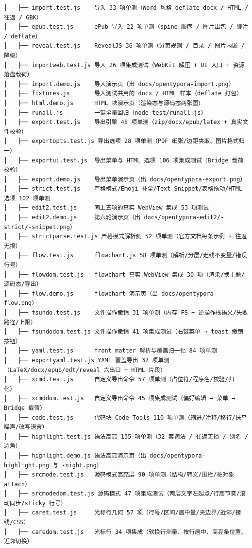 \documentclass[11pt,a4paper]{ctexart}
\begin{document}
\begin{verbatim}
│   ├── import.test.js    导入 33 项单测（Word 风格 deflate docx / HTML / 往返 / GBK）
│   ├── epub.test.js      ePub 导入 22 项单测（spine 顺序 / 图片出包 / 脚注 / deflate）
│   ├── reveal.test.js    RevealJS 36 项单测（分页规则 / 目录 / 图片内嵌 / 降级）
│   ├── importweb.test.js 导入 26 项集成测试（WebKit 解压 + UI 入口 + 资源落盘载荷）
│   ├── import.demo.js    导入演示页（出 docs/opentypora-import.png）
│   ├── fixtures.js       导入测试共用的 docx / HTML 样本（deflate 打包）
│   ├── html.demo.js      HTML 块演示页（渲染态与源码态两张图）
│   ├── runall.js         一键全量回归（node test/runall.js）
│   ├── export.test.js    导出引擎 48 项单测（zip/docx/epub/latex + 真实文件校验）
│   ├── exportopts.test.js 导出选项 28 项单测（PDF 纸张/边距夹取、图片格式归一）
│   ├── exportui.test.js  导出菜单与 HTML 选项 106 项集成测试（Bridge 载荷校验）
│   ├── export.demo.js    导出菜单演示页（出 docs/opentypora-export.png）
│   ├── strict.test.js    严格模式/Emoji 补全/Text Snippet/表格拖动/HTML 选项 102 项单测
│   ├── edit2.test.js     同上五项的真实 WebView 集成 53 项测试
│   ├── edit2.demo.js     第六轮演示页（出 docs/opentypora-edit2/-strict/-snippet.png）
│   ├── strictparse.test.js 严格模式解析侧 52 项单测（官方文档每条示例 + 往返无损）
│   ├── flow.test.js      flowchart.js 58 项单测（解析/分层/走线不变量/错误行号）
│   ├── flowdom.test.js   flowchart 真实 WebView 集成 30 项（渲染/换主题/源码态/导出）
│   ├── flow.demo.js      flowchart 演示页（出 docs/opentypora-flow.png）
│   ├── fsundo.test.js    文件操作撤销 31 项单测（内存 FS + 逆操作栈语义/失败路径/上限）
│   ├── fsundodom.test.js 文件操作撤销 41 项集成测试（右键菜单 → toast 撤销按钮）
│   ├── yaml.test.js      front matter 解析与覆盖归一化 84 项单测
│   ├── exportyaml.test.js YAML 覆盖导出 37 项单测（LaTeX/docx/epub/odt/reveal 六出口 + HTML 片段）
│   ├── xcmd.test.js      自定义导出命令 57 项单测（占位符/程序名/校验/归一化）
│   ├── xcmddom.test.js   自定义导出命令 45 项集成测试（偏好编辑 → 菜单 → Bridge 载荷）
│   ├── code.test.js      代码块 Code Tools 110 项单测（缩进/注释/移行/抹平噪声/改写语言）
│   ├── highlight.test.js 语法高亮 135 项单测（32 套词法 / 往返无损 / 别名 / 边角）
│   ├── highlight.demo.js 语法高亮演示页（出 docs/opentypora-highlight.png 与 -night.png）
│   ├── srcmode.test.js   源码模式高亮层 90 项单测（结构/转义/围栏/桩对象 attach）
│   ├── srcmodedom.test.js 源码模式 47 项集成测试（两层文字左起点/行高节奏/滚动同步/sticky 行号）
│   ├── caret.test.js     光标行几何 57 项（行号/区间/居中量/夹边界/近邻/接线/CSS）
│   ├── caredom.test.js   光标行 34 项集成（软换行测量、按行居中、高亮条位置、近邻切换）

\end{verbatim}
\end{document}
